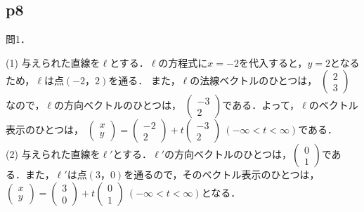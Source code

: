 \documentclass[dvipdfmx,uplatex,11pt]{jsarticle}
\theoremstyle{definition}
\begin{document}
\newpage

\subsection{p8}

問1．

\begin{leftbar}
	(1) \quad 与えられた直線を$\ell$とする．$\ell$の方程式に$x=-2$を代入すると，$y=2$となるため，$\ell$は点$(-2，2)$を通る．
	また，$\ell$の法線ベクトルのひとつは，
	$
	\left(
		\begin{array}{c}
			2 \\
			3
		\end{array}
	\right)
		$なので，$\ell$の方向ベクトルのひとつは，
		$
		\left(
		\begin{array}{c}
			-3 \\
			2
		\end{array}
		\right)
		$である．よって，$\ell$のベクトル表示のひとつは，
		$
		\left(
		\begin{array}{c}
			x \\
			y
		\end{array}
		\right)
		= \left(
		\begin{array}{c}
		-2 \\
		2
		\end{array}
		\right)
		+t \left(
			\begin{array}{c}
				-3 \\
				2
			\end{array}
			\right)
			~(-\infty < t < \infty)$である．\\

			(2) \quad 与えられた直線を$\ell'$とする．$\ell '$の方向ベクトルのひとつは，$
			\left (
				\begin{array}{c}
					0 \\
					1
				\end{array}
			\right)
			$である．また，$\ell '$は点$(3，0)$を通るので，そのベクトル表示のひとつは，
			$
			\left(
				\begin{array}{c}
					x \\
					y
				\end{array}
			\right)
			= \left(
				\begin{array}{c}
				3 \\
				0
				\end{array}
			\right)
			+t \left(
				\begin{array}{c}
					0 \\
					1
					\end{array}
				\right) ~(-\infty < t < \infty)
				$となる．
		\end{leftbar}
\end{document}
